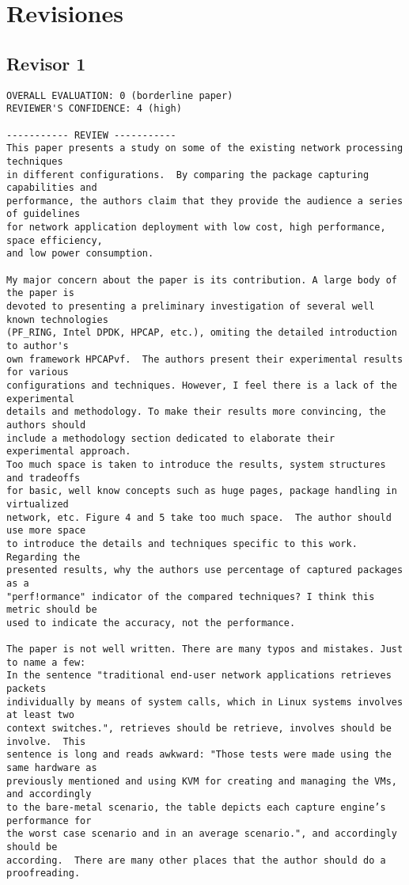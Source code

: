 \section{Revisiones}
\subsection{Revisor 1}
\begin{verbatim}
OVERALL EVALUATION: 0 (borderline paper)
REVIEWER'S CONFIDENCE: 4 (high)

----------- REVIEW -----------
This paper presents a study on some of the existing network processing techniques
in different configurations.  By comparing the package capturing capabilities and
performance, the authors claim that they provide the audience a series of guidelines
for network application deployment with low cost, high performance, space efficiency,
and low power consumption.

My major concern about the paper is its contribution. A large body of the paper is
devoted to presenting a preliminary investigation of several well known technologies
(PF_RING, Intel DPDK, HPCAP, etc.), omiting the detailed introduction to author's
own framework HPCAPvf.  The authors present their experimental results for various
configurations and techniques. However, I feel there is a lack of the experimental
details and methodology. To make their results more convincing, the authors should
include a methodology section dedicated to elaborate their experimental approach.
Too much space is taken to introduce the results, system structures and tradeoffs
for basic, well know concepts such as huge pages, package handling in virtualized
network, etc. Figure 4 and 5 take too much space.  The author should use more space
to introduce the details and techniques specific to this work.   Regarding the
presented results, why the authors use percentage of captured packages as a 
"perf!ormance" indicator of the compared techniques? I think this metric should be
used to indicate the accuracy, not the performance.

The paper is not well written. There are many typos and mistakes. Just to name a few:
In the sentence "traditional end-user network applications retrieves packets
individually by means of system calls, which in Linux systems involves at least two
context switches.", retrieves should be retrieve, involves should be involve.  This
sentence is long and reads awkward: "Those tests were made using the same hardware as
previously mentioned and using KVM for creating and managing the VMs, and accordingly
to the bare-metal scenario, the table depicts each capture engine’s performance for
the worst case scenario and in an average scenario.", and accordingly should be
according.  There are many other places that the author should do a proofreading.
\end{verbatim}

